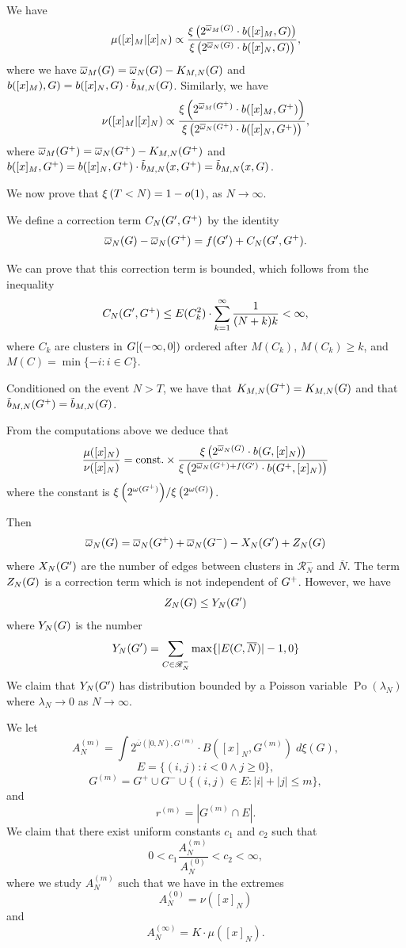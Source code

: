 \documentclass[11pt, a4paper, oneside]{article}
\theoremstyle{definition}
\theoremstyle{remark}
\providecommand{\mscr}{\mathscr}
\providecommand{\opn}{\operatorname}
\providecommand{\ol}{\overline}
\begin{document}
We have
\[
\mu([x]_M|[x]_N)\propto \frac{\XI{ 2^{\ol\omega_M(\t)} \cdot b(\cy M,\t)}}{\XI{ 2^{\ol\omega_N(\t)} \cdot b(\cy N,\t)}},
\]
where we have $\ol\omega_M(\t)=\ol\omega_N(\t)-K_{M,N}(\t)$ and 
$b([x]_{M}),G)=b([x]_{N},G)\cdot \tilde b_{M,N}(G)$. Similarly, we have
\[
\nu([x]_M|[x]_N)\propto \frac{\XI{ 2^{\ol\omega_M(\t^+)} \cdot b(\cy M,\t^+)}}{\XI{ 2^{\ol\omega_N(\t^+)} \cdot b(\cy N,\t^+)}},
\]
where $\ol\omega_M(\t^+)=\ol\omega_N(\t^+)-K_{M,N}(\t^+)$ and 
$b([x]_{M},G^+)=b([x]_{N},G^+)\cdot \tilde b_{M,N}(x,G^+)=\tilde b_{M,N}(x,G)$. 

We now prove that $\xi\left(T<N\right)=1-o(1)$, as $N\to \infty$.

We define a correction term $C_N(G',G^+)$ by the identity $$\ol\omega_N(\t)-\ol\omega_N(\t^+)=f(\t')+C_N(\t',\t^+).$$ 

We can prove that this correction term is bounded, which follows from the inequality 
$$
C_N(G',G^+)\leq 
E(C_k^2) \cdot \sum _{k=1}^\infty \frac{1}{(N+k)k}<\infty,
$$
where $C_k$ are clusters in $G[(-\infty, 0])$ ordered after $M(C_k)$,
$M(C_k)\geq k$, and $M(C)=\min \{-i : i\in C \}$.

Conditioned on the event $N>T$, we have that $K_{M,N}(G^+)=K_{M,N}(G)$ and that $\tilde b_{M,N}(G^+)=\tilde b_{M,N}(G)$.

From the computations above we deduce that 
\[
  \frac{\mu(\cy\N)}{\nu(\cy\N)} = \text{const.} \times
  \frac{\XI{2^{\ol\omega_\N(\t)} \cdot b(\t,\cy\N)}}
  {\XI{2^{\ol\omega_\N(\t^+) + f(\t')} \cdot b(\t^+,\cy\N)}}
\]
where the constant is \({\xi\left(2^{\omega(G^+)}\right)}/{\xi\left(2^{\omega(G)}\right)}\).


Then
\begin{equation}
  \ol\omega_N(\t) = \ol\omega_N(\t^+) + \ol\omega_N(\t^-) - X_N(\t') + Z_N(\t)
\end{equation}
where $X_N(G')$ are the number of edges between clusters in $\mscr R^-_N$ and
$\ol N$. The term $Z_N(G)$ is a correction term which is not independent of $G^+$.
However, we have
\[ Z_N(G) \le Y_N(G')\]
where $Y_N(G)$ is the number
\[
  Y_N(\t') = \sum_{C\in\mscr R^-_N} \max\{|E(C,\ol N)|-1,0\}
\]
We claim that $Y_N(G')$ has distribution bounded by a Poisson variable
$\opn{Po}(\lambda_N)$ where $\lambda_N\to 0$ as $N\to\infty$. 


We let 
$$A_N^{(m)}= \int 2^{\overline{\omega}([0,N), G^{(m)}}\cdot B([x]_N,G^{(m)}) \; d\xi (G),$$
$$E=\{(i,j): i<0 \wedge j\geq 0\},$$
$$G^{(m)}=G^+ \cup G^- \cup \{(i,j)\in E: |i|+|j|\leq m\},$$
and
$$r^{(m)}=|G^{(m)}\cap E|.$$
We claim that there exist uniform constants $c_1$ and $c_2$ such that
$$0<c_1\frac{A_N^{(m)}}{A_N^{(0)}}<c_2<\infty,$$
where we study $A_N^{(m)}$ such that we have in the extremes
$$A_N^{(0)}=\nu([x]_N)$$
and 
$$A_N^{(\infty)}=K\cdot \mu([x]_N).$$
\end{document}
